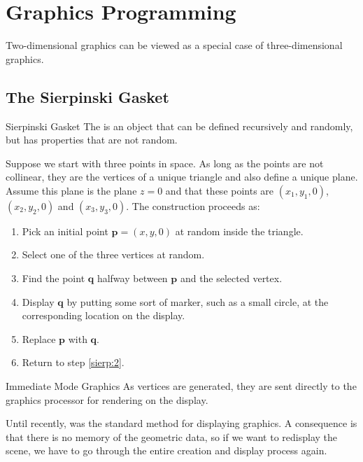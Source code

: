 \documentclass[../notes.tex]{subfiles}
\begin{document}
  \setcounter{chapter}{1}
  \chapter{Graphics Programming}
    Two-dimensional graphics can be viewed as a special case of three-dimensional graphics.

    \section{The Sierpinski Gasket}
      \begin{definition}{Sierpinski Gasket}
        The  is an object that can be defined recursively and randomly,
        but has properties that are not random.

        Suppose we start with three points in space.
        As long as the points are not collinear, they are the vertices of a unique triangle
        and also define a unique plane.
        Assume this plane is the plane $z = 0$ and that these points are $(x_1, y_1, 0)$,
        $(x_2, y_2, 0)$ and $(x_3, y_3, 0)$.
        The construction proceeds as:
        \begin{enumerate}
          \item Pick an initial point $\mathbf{p} = (x, y, 0)$ at random inside the triangle.
          \item \label{sierp:2} Select one of the three vertices at random.
          \item Find the point $\mathbf{q}$ halfway between $\mathbf{p}$ and the selected vertex.
          \item Display $\mathbf{q}$ by putting some sort of marker,
            such as a small circle,
            at the corresponding location on the display.
          \item Replace $\mathbf{p}$ with $\mathbf{q}$.
          \item Return to step \ref{sierp:2}.
        \end{enumerate}
      \end{definition}

      \begin{definition}{Immediate Mode Graphics}
        As vertices are generated, they are sent directly to the graphics processor
        for rendering on the display.

        Until recently, was the standard method for displaying graphics.
        A consequence is that there is no memory of the geometric data,
        so if we want to redisplay the scene, we have to go through the entire creation
        and display process again.
      \end{definition}
\end{document}
